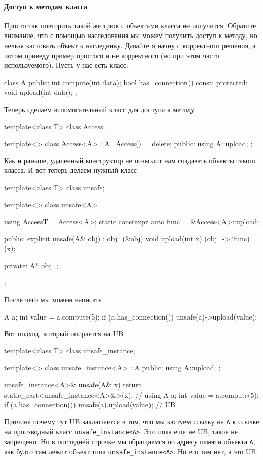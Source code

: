 \paragraph{Доступ к методам класса}

Просто так повторить такой же трюк с объектами класса не получится.
Обратите внимание, что с помощью наследования мы можем получить доступ к методу, но нельзя кастовать объект к наследнику.
Давайте я начну с корректного решения, а потом приведу пример простого и не корректного (но при этом часто используемого).
Пусть у нас есть класс:
\begin{cppcode}
class A {
public:
  int compute(int data);
  bool has_connection() const;
protected:
  void upload(int data);
};
\end{cppcode}
Теперь сделаем вспомогательный класс для доступа к методу
\begin{cppcode}
template<class T>
class Access;

template<>
class Access<A> : A {
  ~Access() = delete;
public:
  using A::upload;
};
\end{cppcode}
Как и раньше, удаленный конструктор не позволит нам создавать объекты такого класса.
И вот теперь делаем нужный класс
\begin{cppcode}
template<class T>
class unsafe;

template<>
class unsafe<A> {
  using AccessT = Access<A>;
  static constexpr auto func = &Access<A>::upload;

public:
  explicit unsafe(A& obj) : obj_(&obj) {
  }
  void upload(int x) {
    (obj_->*func)(x);
  }

private:
  A* obj_;
};
\end{cppcode}
После чего мы можем написать
\begin{cppcode}
A a;
int value = a.compute(5);
if (a.has_connection())
  unsafe(a)->upload(value);
\end{cppcode}
Вот подход, который опирается на UB
\begin{cppcode}
template<class T>
class unsafe_instance;

template<>
class unsafe_instance<A> : A {
public:
  using A::upload;
};

unsafe_instance<A>& unsafe(A& x) {
  return static_cast<unsafe_instance<A>&>(x);
}
// using
A a;
int value = a.compute(5);
if (a.has_connection())
  unsafe(a).upload(value); // UB
\end{cppcode}
Причина почему тут UB заключается в том, что мы кастуем ссылку на \verb"A" к ссылке на производный класс \verb"unsafe_instance<A>".
Это пока еще не UB, такое не запрещено.
Но в последней строчке мы обращаемся по адресу памяти объекта \verb"A", как будто там лежит объект типа \verb"unsafe_instance<A>".
Но его там нет, а это UB.

